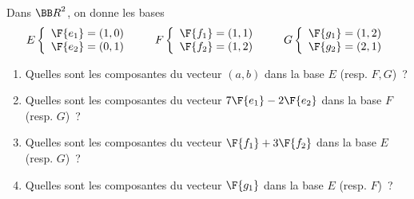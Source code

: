 \documentclass[12pt,french,oneside,a4paper]{memoir} %
\begin{document}
\begin{exo} %
Dans ${\BB R}^2$, on donne les bases
\begin{equation*}
E \left\{ \begin{array}{l}
\F{e_1}=(1,0) \\
\F{e_2}=(0,1)
\end{array} \right.
\qquad
F \left\{ \begin{array}{l}
\F{f_1}=(1,1) \\
\F{f_2}=(1,2)
\end{array} \right.
\qquad
G \left\{ \begin{array}{l}
\F{g_1}=(1,2) \\
\F{g_2}=(2,1)
\end{array} \right.
\end{equation*}
\begin{enumerate}
\item Quelles sont les composantes du vecteur $(a,b)$ dans la base $E$ 
(resp. $F,G$)~?
\item Quelles sont les composantes du vecteur $7 \F{e_1}-2 \F{e_2}$ 
dans la base $F$ (resp. $G$)~?
\item Quelles sont les composantes du vecteur $\F{f_1}+3 \F{f_2}$ 
dans la base $E$ (resp. $G$)~?
\item Quelles sont les composantes du vecteur $\F{g_1}$ dans la base $E$ 
(resp. $F$)~?
\end{enumerate}


\end{exo}
\end{document}

